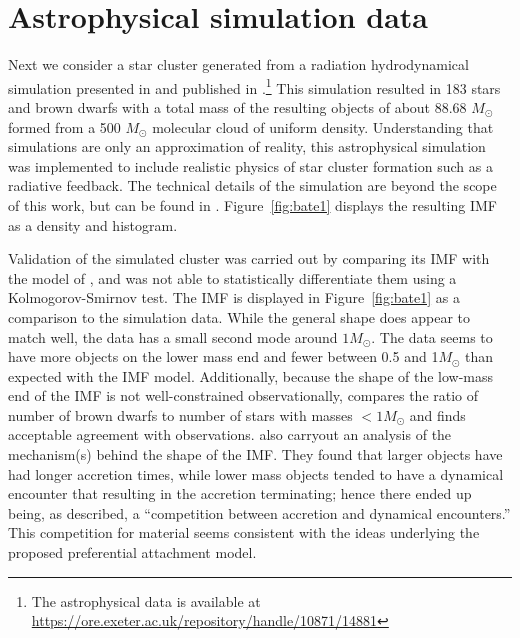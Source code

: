 \documentclass[ejs]{imsart}
\numberwithin{equation}{section}
\theoremstyle{plain}
\newcommand{\Msun}{M_{\odot}}
\begin{document}
\section{Astrophysical simulation data} \label{sec:bate}

Next we consider a star cluster generated from a radiation hydrodynamical simulation presented in \cite{Bate2012} and published in \cite{Bate2014}.\footnote{The astrophysical data is available at \url{https://ore.exeter.ac.uk/repository/handle/10871/14881}}  
This simulation resulted in 183 stars and brown dwarfs with a total mass of the resulting objects of about 88.68 $\Msun$ formed from a 500 $\Msun$ molecular cloud of uniform density.  
Understanding that simulations are only an approximation of reality, this astrophysical simulation was implemented to include realistic physics of star cluster formation such as a radiative feedback. 
The technical details of the simulation are beyond the scope of this work, but can be found in \cite{Bate2012}.
Figure~\ref{fig:bate1} displays the resulting IMF as a density and histogram.
%

Validation of the simulated cluster was carried out by comparing its IMF with the model of \cite{chabrier2005}, and was not able to statistically differentiate them using a Kolmogorov-Smirnov test.  The \cite{chabrier2005} IMF is displayed in Figure~\ref{fig:bate1} as a comparison to the simulation data.  While the general shape does appear to match well, the \cite{Bate2012} data has a small second mode around $1\Msun$.  The \cite{Bate2012} data seems to have more objects on the lower mass end and fewer between 0.5 and 1$\Msun$ than expected with the \cite{chabrier2005} IMF model.
%
Additionally, because the shape of the low-mass end of the IMF is not well-constrained observationally,  \cite{Bate2012} compares the ratio of number of brown dwarfs to number of stars with masses $<1\Msun$ and finds acceptable agreement with observations. 
%
\cite{Bate2012} also carryout an analysis of the mechanism(s) behind the shape of the IMF.  
They found that larger objects have had longer accretion times, while lower mass objects tended to have a dynamical encounter that resulting in the accretion terminating; hence there ended up being, as \cite{Bate2012} described, a ``competition between accretion and dynamical encounters.''  This competition for material seems consistent with the ideas underlying the proposed preferential attachment model.
\end{document}
